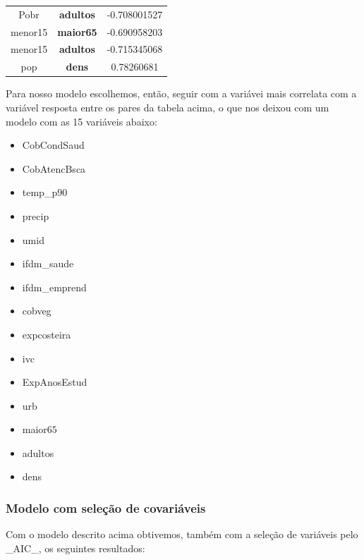 \documentclass[12pt,a4paper]{article}\usepackage[]{graphicx}\usepackage[]{color}
\begin{document}
\begin{table}[H]
\begin{center}
\begin{tabular}{c|c|c}
Pobr                               & \textbf{adultos}     & -0.708001527                    \\
menor15                            & \textbf{maior65}     & -0.690958203                    \\
menor15                            & \textbf{adultos}     & -0.715345068                    \\
pop                                & \textbf{dens}        & 0.78260681                      \\ \hline
\end{tabular}
\end{center}
\end{table}

Para nosso modelo escolhemos, então, seguir com a variávei mais correlata com a variável resposta entre os pares da tabela acima, o que nos deixou com um modelo com as 15 variáveis abaixo:

\begin{itemize}
  \item CobCondSaud
  \item CobAtencBsca
  \item temp\_p$90$
  \item precip
  \item umid
  \item ifdm\_saude
  \item ifdm\_emprend
  \item cobveg
  \item expcosteira
  \item ivc
  \item ExpAnosEstud
  \item urb
  \item maior$65$
  \item adultos
  \item dens
\end{itemize}


\subsubsection{\textbf{Modelo com seleção de covariáveis}}

Com o modelo descrito acima obtivemos, também com a seleção de variáveis pelo \_AIC\_, os seguintes resultados:
\end{document}

